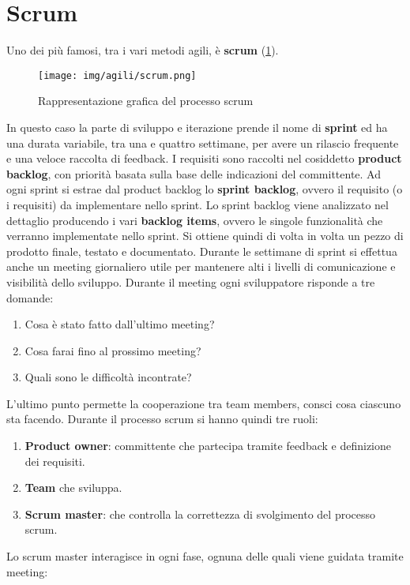 \section{Scrum}
Uno dei più famosi, tra i vari metodi agili, è \textbf{scrum} (\ref{fig:scrum}).
\begin{figure}[!ht]
      \centering
      \texttt{[image: img/agili/scrum.png]}
      \caption{Rappresentazione grafica del processo scrum}
      \label{fig:scrum}
\end{figure}
In questo caso la parte di sviluppo e iterazione prende il nome di \textbf{sprint}
ed ha una durata variabile, tra una e quattro settimane, per avere un rilascio
frequente e una veloce raccolta di feedback. I requisiti sono raccolti nel cosiddetto
\textbf{product backlog}, con priorità basata sulla base delle indicazioni del
committente. Ad ogni sprint si estrae dal product backlog lo \textbf{sprint backlog},
ovvero il requisito (o i requisiti) da implementare nello sprint. Lo sprint backlog
viene analizzato nel dettaglio producendo i vari \textbf{backlog items}, ovvero
le singole funzionalità che verranno implementate nello sprint. Si ottiene quindi
di volta in volta un pezzo di prodotto finale, testato e documentato. Durante le
settimane di sprint si effettua anche un meeting giornaliero utile per mantenere
alti i livelli di comunicazione e visibilità dello sviluppo. Durante il meeting
ogni sviluppatore risponde a tre domande:
\begin{enumerate}
      \item Cosa è stato fatto dall'ultimo meeting?
      \item Cosa farai fino al prossimo meeting?
      \item Quali sono le difficoltà incontrate?
\end{enumerate}
L'ultimo punto permette la cooperazione tra team members, consci cosa ciascuno
sta facendo. Durante il processo scrum si hanno quindi tre ruoli:
\begin{enumerate}
      \item \textbf{Product owner}: committente che partecipa tramite feedback
            e definizione dei requisiti.
      \item \textbf{Team} che sviluppa.
      \item \textbf{Scrum master}: che controlla la correttezza di svolgimento
            del processo scrum.
\end{enumerate}
Lo scrum master interagisce in ogni fase, ognuna delle quali viene guidata
tramite meeting:
